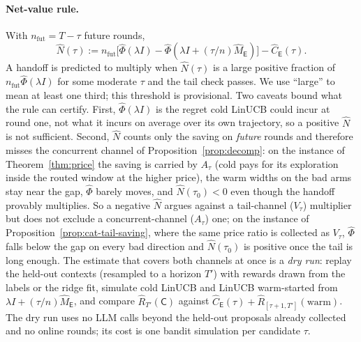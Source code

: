 \documentclass{article}
\theoremstyle{definition}
\theoremstyle{remark}
\theoremstyle{remark}
\newcommand{\Cold}{\mathsf{C}}
\newcommand{\Exp}{\mathsf{E}}
\begin{document}
\paragraph{Net-value rule.} With $n_{\mathrm{fut}}=T-\tau$ future rounds,
\[
\widehat N(\tau):=n_{\mathrm{fut}}\bigl[\widehat\Phi(\lambda I)-\widehat\Phi(\lambda I+(\tau/n)\widehat M_{\Exp})\bigr]-\widehat C_{\Exp}(\tau).
\]
A handoff is predicted to multiply when $\widehat N(\tau)$ is a large
positive fraction of $n_{\mathrm{fut}}\widehat\Phi(\lambda I)$ for some
moderate $\tau$ and the tail check passes. We use ``large'' to mean at least
one third; this threshold is provisional. Two caveats bound what the rule
can certify. First, $\widehat\Phi(\lambda I)$ is the regret cold LinUCB could
incur at round one, not what it incurs on average over its own trajectory,
so a positive $\widehat N$ is not sufficient. Second, $\widehat N$ counts only
the saving on \emph{future} rounds and therefore misses the concurrent
channel of Proposition~\ref{prop:decomp}: on the instance of
Theorem~\ref{thm:price} the saving is carried by $A_\tau$ (cold pays for its
exploration inside the routed window at the higher price), the warm widths on
the bad arms stay near the gap, $\widehat\Phi$ barely moves, and
$\widehat N(\tau_0)<0$ even though the handoff provably multiplies. So a
negative $\widehat N$ argues against a tail-channel ($V_\tau$) multiplier but
does not exclude a concurrent-channel ($A_\tau$) one; on the instance of
Proposition~\ref{prop:cat-tail-saving}, where the same price ratio is
collected as $V_\tau$, $\widehat\Phi$ falls below the gap on every bad
direction and $\widehat N(\tau_0)$ is positive once the tail is long enough.
The estimate that covers both channels at once is a \emph{dry run}: replay the
held-out contexts (resampled to a horizon $T'$) with rewards drawn from the
labels or the ridge fit, simulate cold LinUCB and LinUCB warm-started from
$\lambda I+(\tau/n)\widehat M_{\Exp}$, and compare
$\widehat R_{T'}(\Cold)$ against
$\widehat C_{\Exp}(\tau)+\widehat R_{[\tau+1,T']}(\mathrm{warm})$. The dry run
uses no LLM calls beyond the held-out proposals already collected and no
online rounds; its cost is one bandit simulation per candidate $\tau$.
\end{document}
